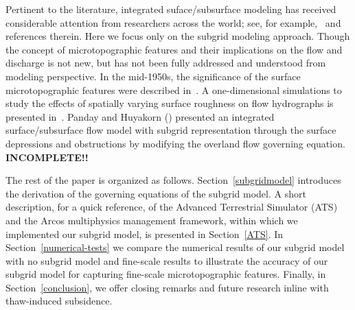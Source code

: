 \documentclass[review,11pt]{elsarticle}
\begin{document}
Pertinent to the literature, integrated suface/subsurface modeling has received considerable attention from researchers across the world; see, for example,~\cite{painter2013modeling,kurylyk2014climate,spainter2016integrated} and references therein. Here we focus only on the subgrid modeling approach. Though the concept of microtopographic features and their implications on the flow and discharge is not new, but has not been fully addressed and understood from modeling perspective. 
In the mid-1950s, the significance of the surface microtopographic features were described in~\cite{stammers1956effect}. 
A one-dimensional simulations to study the effects of spatially varying surface roughness on flow hydrographs is presented in~\cite{huang2009influences}.
Panday and Huyakorn (\citeyear{panday2004fully}) presented an integrated surface/subsurface flow model with subgrid representation through the surface depressions and obstructions by modifying the overland flow governing equation. \textbf{INCOMPLETE!!}

The rest of the paper is organized as follows. Section~\ref{subgridmodel} introduces the derivation of the governing equations of the subgrid model. A short description, for a quick reference, of the Advanced Terrestrial Simulator (ATS) and the Arcos multiphysics management framework, within which we implemented our subgrid model, is presented in Section~\ref{ATS}. In Section~\ref{numerical-tests} we compare the numerical results of our subgrid model with no subgrid model and fine-scale results to illustrate the accuracy of our subgrid model for capturing fine-scale microtopographic features. Finally, in Section~\ref{conclusion}, we offer closing remarks and future research inline with thaw-induced subsidence.
\end{document}
